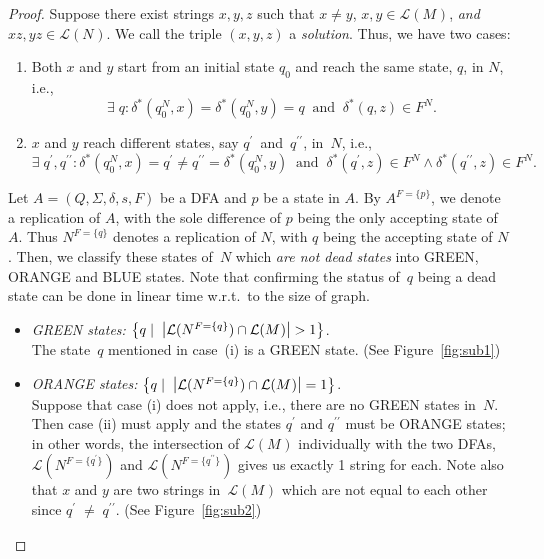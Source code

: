 \documentclass{lmcs} %
\theoremstyle{plain}\newtheorem{satz}[thm]{Satz} %
\begin{document}
\begin{appendices}
\begin{proof}
Suppose there exist strings $x, y, z$ such that $x \neq y$, $x, y \in
\mathcal{L}( M^{} )$, \emph{and} \mbox{$xz, yz \in \mathcal{L}( N^{}
  )$}. We call the triple $(x, y, z)$ a \emph{solution}. Thus, we have two cases:

\begin{enumerate}[label=(\roman*)]
\item Both $x$ and $y$ start from an initial state $q_0$ and reach the
  same state, $q$, in $N$, i.e., \[ \exists\; q: \delta_{}^*(q_0^{N},
  x) = \delta_{}^*(q_0^{N}, y) = q \; \; \mathrm{and} \; \; \delta_{}^*(q, z) \in
  F^{N}. \]
\item $x$ and $y$ reach different states, say $q^{\prime}$~and~$q^{\prime\prime}$,
  in~$N$, i.e., \[ \exists\; q^{\prime}, q^{\prime\prime}: \delta_{}^*(q_0^{N},
  x) = q^{\prime} \neq q^{\prime\prime} = \delta_{}^*(q_0^{N}, y) \; \; \mathrm{and} \; \;
  \delta_{}^*(q^{\prime}, z) \in F^{N} \land \delta_{}^*(q^{\prime\prime}, z) \in
  F^{N}. \]
\end{enumerate}

Let $A=(Q, \Sigma, \delta, s, F)$ be a DFA and $p$ be a state in
$A$. By $A^{F = \{ p \}}$, we denote a replication of $A$, with
the sole difference of $p$ being the only accepting state of
$A$. Thus $N^{F = \{ q \}}$ denotes a replication of
$N$, with $q$ being the accepting state of $N$. Then, we classify
these states of~$N$ which \emph{are not dead states} into GREEN,
ORANGE and BLUE states. Note that confirming the status of~$q$
being a dead state can be done in linear time w.r.t.\ to the size
of graph.
\begin{itemize}
\item \emph{GREEN states:} $\big\{ q \mid \; \scalebox{1.2}{$\mid$}  \mathcal{L}( N^{F=\{ q \}}) \cap \mathcal{L}( M^{}) \scalebox{1.2}{$\mid$} > 1 \big\}$. \\
  
  The state~$q$ mentioned in case~(i) is a GREEN state. (See Figure~\ref{fig:sub1})

\item \emph{ORANGE states:} $\big\{ q \mid \; \scalebox{1.2}{$\mid$}  \mathcal{L}( N^{F=\{ q \}}) \cap \mathcal{L}( M^{}) \scalebox{1.2}{$\mid$} = 1 \big\}$. \\
  
Suppose that case (i) does not apply, i.e., there are no GREEN states in~$N$. 
Then case (ii) must apply and the states $q^{\prime}$
and $q^{\prime\prime}$ must be ORANGE states; in other words, the intersection of
$\mathcal{L}( M^{})$ individually with the two DFAs, $\mathcal{L}(
N^{F=\{ q^{\prime} \}})$ and $\mathcal{L}( N^{F=\{ q^{\prime\prime} \}})$ gives us
exactly 1 string for each. Note also that $x$ and $y$ are two
strings in~$\mathcal{L}( M^{})$ which are not equal to each other since
$q_{}^{\prime} \; \neq \; q_{}^{\prime\prime}$. (See Figure~\ref{fig:sub2})


\end{itemize}
\end{proof}
\end{appendices}
\end{document}
